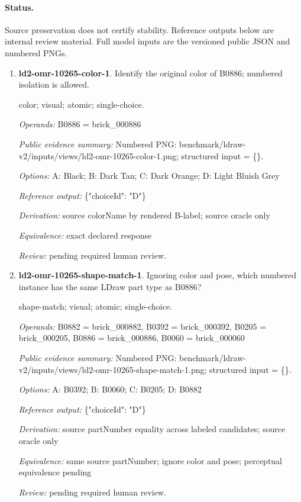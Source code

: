 \paragraph{Status.}Source preservation does not certify stability. Reference outputs below are internal review material. Full model inputs are the versioned public JSON and numbered PNGs.
\begin{enumerate}
\item \textbf{ld2-omr-10265-color-1}. Identify the original color of B0886; numbered isolation is allowed.
\par{\small color; visual; atomic; single-choice.\par\textit{Operands:} B0886 = brick\_000886\par\textit{Public evidence summary:} Numbered PNG: benchmark/ldraw-v2/inputs/views/ld2-omr-10265-color-1.png; structured input = \{\}.\par\textit{Options:} A: Black; B: Dark Tan; C: Dark Orange; D: Light Bluish Grey\par\textit{Reference output:} \{"choiceId": "D"\}\par\textit{Derivation:} source colorName by rendered B-label; source oracle only\par\textit{Equivalence:} exact declared response\par\textit{Review:} pending required human review.}
\item \textbf{ld2-omr-10265-shape-match-1}. Ignoring color and pose, which numbered instance has the same LDraw part type as B0886?
\par{\small shape-match; visual; atomic; single-choice.\par\textit{Operands:} B0882 = brick\_000882, B0392 = brick\_000392, B0205 = brick\_000205, B0886 = brick\_000886, B0060 = brick\_000060\par\textit{Public evidence summary:} Numbered PNG: benchmark/ldraw-v2/inputs/views/ld2-omr-10265-shape-match-1.png; structured input = \{\}.\par\textit{Options:} A: B0392; B: B0060; C: B0205; D: B0882\par\textit{Reference output:} \{"choiceId": "D"\}\par\textit{Derivation:} source partNumber equality across labeled candidates; source oracle only\par\textit{Equivalence:} same source partNumber; ignore color and pose; perceptual equivalence pending\par\textit{Review:} pending required human review.}

\end{enumerate}
